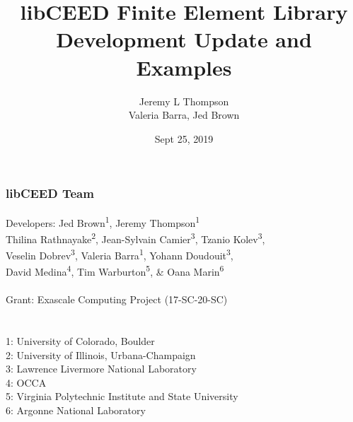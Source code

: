 \documentclass{beamer}
\title[libCEED Finite Element Library]{libCEED Finite Element Library\\Development Update and Examples} %
\author[Jeremy L Thompson]{Jeremy L Thompson\\Valeria Barra, Jed Brown} %
\institute[CU Boulder] %
{University of Colorado Boulder \\ %
\medskip
\textit{jeremy.thompson@colorado.edu} %
}
\date{Sept 25, 2019} %
\begin{document}
\begin{frame}
\titlepage %
\end{frame}


\begin{frame}
\begin{center}
\frametitle{libCEED Team}

{\flushleft

Developers: \hspace{2mm} Jed Brown\textsuperscript{1}, Jeremy Thompson\textsuperscript{1} \\
\hspace{23mm}  Thilina Rathnayake\textsuperscript{2}, Jean-Sylvain Camier\textsuperscript{3}, Tzanio Kolev\textsuperscript{3},\\
\hspace{23mm} Veselin Dobrev\textsuperscript{3}, Valeria Barra\textsuperscript{1}, Yohann Doudouit\textsuperscript{3},\\
\hspace{23mm} David Medina\textsuperscript{4}, Tim Warburton\textsuperscript{5}, \& Oana Marin\textsuperscript{6}\\

~\\

Grant: \hspace{11mm} Exascale Computing Project (17-SC-20-SC)\\

~\\

~\\

\small{1: University of Colorado, Boulder\\
2: University of Illinois, Urbana-Champaign\\
3: Lawrence Livermore National Laboratory\\
4: OCCA\\
5: Virginia Polytechnic Institute and State University\\
6: Argonne National Laboratory\\}}

\end{center}
\end{frame}
\end{document}
